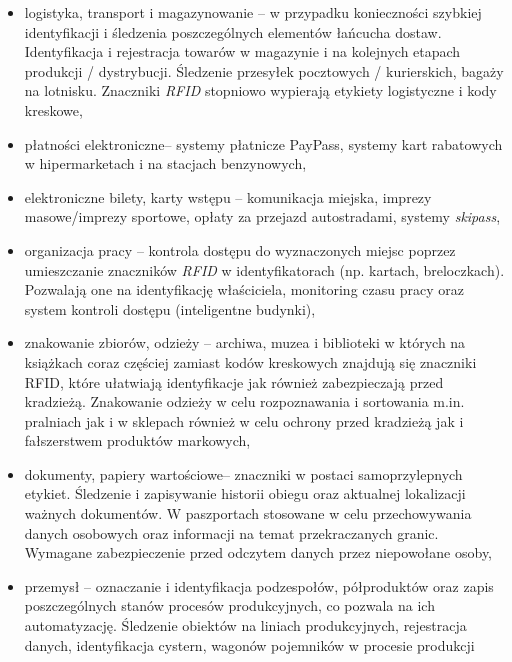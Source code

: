 \begin{itemize}\setlength{\itemsep}{0pt}
	\item logistyka, transport i magazynowanie – w przypadku konieczności szybkiej identyfikacji i śledzenia poszczególnych elementów łańcucha dostaw. Identyfikacja i rejestracja towarów w magazynie i na kolejnych etapach produkcji / dystrybucji.  Śledzenie przesyłek pocztowych / kurierskich, bagaży na lotnisku.  Znaczniki \emph{RFID} stopniowo wypierają etykiety logistyczne i kody kreskowe,

	\item płatności elektroniczne– systemy płatnicze PayPass, systemy kart rabatowych w hipermarketach i na stacjach benzynowych, 

	\item elektroniczne bilety, karty wstępu – komunikacja miejska, imprezy masowe/imprezy sportowe, opłaty za przejazd autostradami, systemy \emph{skipass},

	\item organizacja pracy – kontrola dostępu do wyznaczonych miejsc poprzez umieszczanie znaczników \emph{RFID} w identyfikatorach (np. kartach, breloczkach). Pozwalają one na identyfikację właściciela, monitoring czasu pracy oraz system kontroli dostępu (inteligentne budynki),

	\item znakowanie zbiorów, odzieży – archiwa, muzea i biblioteki w których na książkach coraz częściej zamiast kodów kreskowych znajdują się znaczniki RFID, które ułatwiają identyfikacje jak również zabezpieczają przed kradzieżą. Znakowanie odzieży w celu rozpoznawania i sortowania m.in. pralniach jak i w sklepach również w celu ochrony przed kradzieżą jak i fałszerstwem produktów markowych,
 	
 	\item dokumenty, papiery wartościowe– znaczniki w postaci samoprzylepnych etykiet. Śledzenie i zapisywanie historii obiegu oraz aktualnej lokalizacji ważnych dokumentów.  W paszportach stosowane w celu przechowywania danych osobowych oraz informacji na temat przekraczanych granic. Wymagane zabezpieczenie przed odczytem danych przez niepowołane osoby,
	
	\item przemysł – oznaczanie i  identyfikacja podzespołów, półproduktów oraz zapis poszczególnych stanów procesów produkcyjnych, co pozwala na ich automatyzację. Śledzenie obiektów na liniach produkcyjnych, rejestracja danych, identyfikacja cystern, wagonów pojemników w procesie produkcji
	

\end{itemize}
